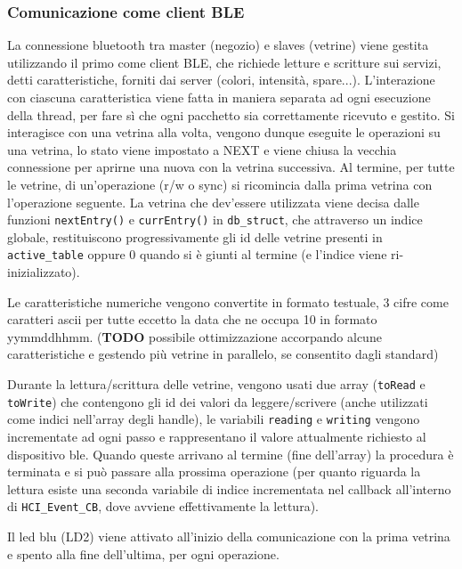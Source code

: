 \subsubsection{Comunicazione come client BLE}


La connessione bluetooth tra master (negozio) e slaves (vetrine) viene gestita utilizzando il primo come client BLE, che richiede letture e scritture sui servizi, detti caratteristiche, forniti dai server (colori, intensit\`a, spare...). L'interazione con ciascuna caratteristica viene fatta in maniera separata ad ogni esecuzione della thread, per fare s\`i che ogni pacchetto sia correttamente ricevuto e gestito. Si interagisce con una vetrina alla volta, vengono dunque eseguite le operazioni su una vetrina, lo stato viene impostato a NEXT e viene chiusa la vecchia connessione per aprirne una nuova con la vetrina successiva. Al termine, per tutte le vetrine, di un'operazione (r/w o sync) si ricomincia dalla prima vetrina con l'operazione seguente. La vetrina che dev'essere utilizzata viene decisa dalle funzioni \texttt{nextEntry()} e \texttt{currEntry()} in \texttt{db\_struct}, che attraverso un indice globale, restituiscono progressivamente gli id delle vetrine presenti in \texttt{active\_table} oppure 0 quando si \`e giunti al termine (e l'indice viene ri-inizializzato). 

Le caratteristiche numeriche vengono convertite in formato testuale, 3 cifre come caratteri ascii per tutte eccetto la data che ne occupa 10 in formato yymmddhhmm. (\textbf{TODO} possibile ottimizzazione accorpando alcune caratteristiche e gestendo pi\`u vetrine in parallelo, se consentito dagli standard)

Durante la lettura/scrittura delle vetrine, vengono usati due array (\texttt{toRead} e \texttt{toWrite}) che contengono gli id dei valori da leggere/scrivere (anche utilizzati come indici nell'array degli handle), le variabili \texttt{reading} e \texttt{writing} vengono incrementate ad ogni passo e rappresentano il valore attualmente richiesto al dispositivo ble. Quando queste arrivano al termine (fine dell'array) la procedura \`e terminata e si pu\`o passare alla prossima operazione (per quanto riguarda la lettura esiste una seconda variabile di indice incrementata nel callback all'interno di \texttt{HCI\_Event\_CB}, dove avviene effettivamente la lettura).

Il led blu (LD2) viene attivato all'inizio della comunicazione con la prima vetrina e spento alla fine dell'ultima, per ogni operazione.

